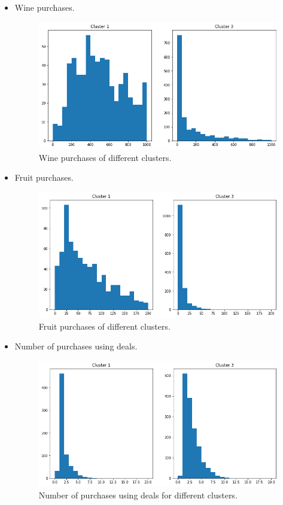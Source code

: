 \documentclass[11pt]{article}
\begin{document}
\begin{itemize}
\newpage

\item Wine purchases.

\begin{figure}[h!]
\centerline{\includegraphics[scale=0.35]{clu_conc_6.png}}
\caption{Wine purchases of different clusters.}
\end{figure}

\item Fruit purchases.

\begin{figure}[h!]
\centerline{\includegraphics[scale=0.35]{clu_conc_7.png}}
\caption{Fruit purchases of different clusters.}
\end{figure}

\item Number of purchases using deals.

\begin{figure}[h!]
\centerline{\includegraphics[scale=0.35]{clu_conc_8.png}}
\caption{Number of purchases using deals for different clusters.}
\end{figure}


\end{itemize}
\end{document}
